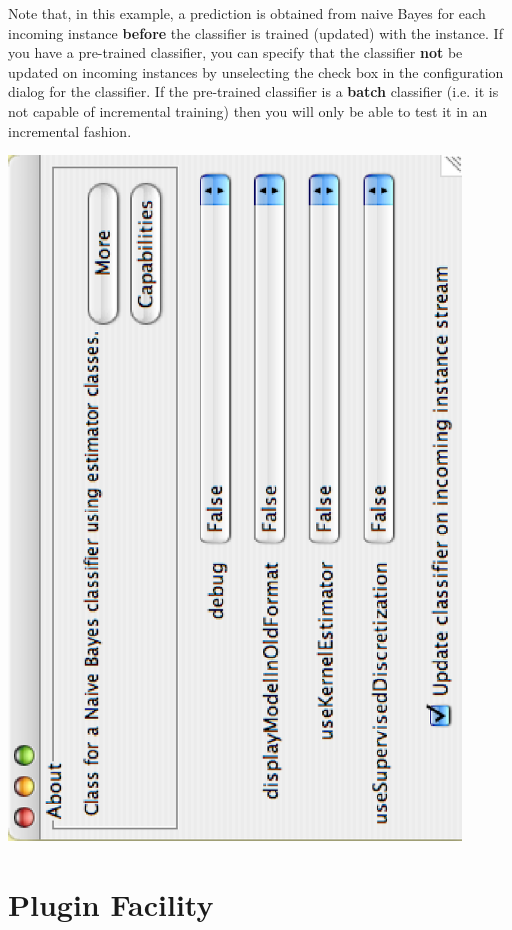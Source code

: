 Note that, in this example, a prediction is obtained from naive Bayes
for each incoming instance {\bf before} the classifier is trained
(updated) with the instance. If you have a pre-trained classifier, you
can specify that the classifier {\bf not} be updated on incoming
instances by unselecting the check box in the configuration dialog for
the classifier. If the pre-trained classifier is a {\bf batch}
classifier (i.e. it is not capable of incremental training) then you
will only be able to test it in an incremental fashion.

\begin{center}
  \includegraphics[angle=270,width=12cm]{images/knowledgeflow/IncrementalClassifierConfig.eps}
\end{center}

\newpage
\section{Plugin Facility}


